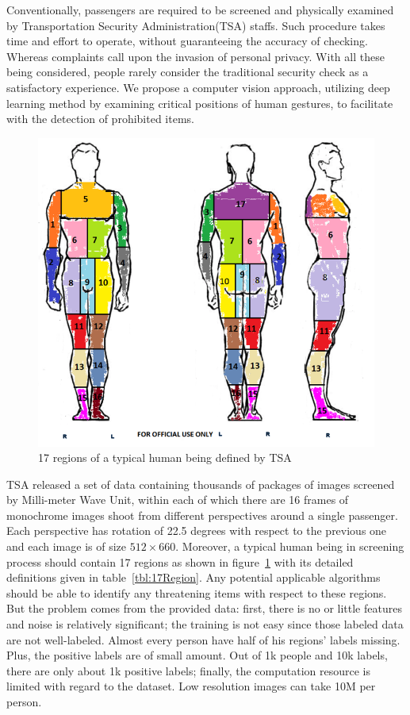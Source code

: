 \documentclass[conference,compsoc]{IEEEtran}
\begin{document}
\par Conventionally, passengers are required to be screened and physically examined by Transportation Security Administration(TSA) staffs. Such procedure takes time and effort to operate, without guaranteeing the accuracy of checking. Whereas complaints call upon the invasion of personal privacy. With all these being considered, people rarely consider the traditional security check as a satisfactory experience. We propose a computer vision approach, utilizing deep learning method by examining critical positions of human gestures, to facilitate with the detection of prohibited items.
\begin{figure}[!tp]
\includegraphics[width=.5\textwidth]{../Pic/body_zones}
\caption{17 regions of a typical human being defined by TSA}
\label{fig:17Region}
\end{figure}

TSA released a set of data containing thousands of packages of images screened by Milli-meter Wave Unit, within each of which there are 16 frames of monochrome images shoot from different perspectives around a single passenger. Each perspective has rotation of 22.5 degrees with respect to the previous one and each image is of size $512\times660$. Moreover, a typical human being in screening process should contain 17 regions as shown in figure~\ref{fig:17Region} with its detailed definitions given in table~\ref{tbl:17Region}. Any potential applicable algorithms should be able to identify any threatening items with respect to these regions. But the problem comes from the provided data: first, there is no or little features and noise is relatively significant; the training is not easy since those labeled data are not well-labeled. Almost every person have half of his regions' labels missing. Plus, the positive labels are of small amount. Out of 1k people and 10k labels, there are only about 1k positive labels; finally, the computation resource is limited with regard to the dataset. Low resolution images can take 10M per person.
\end{document}
